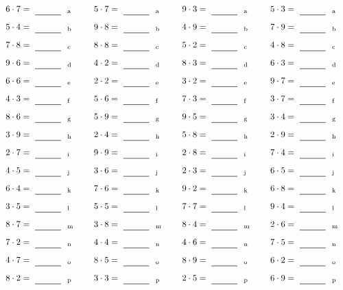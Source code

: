\documentclass
[
  draft    = true,
  fontsize = 11pt,
  parskip  = half-
]
{scrartcl}
\begin{document}
\par\vfill\par
\begin{align*}
    \pline{6\cdot7}&=\rline{a}
  & \pline{5\cdot7}&=\rline{a}
  & \pline{9\cdot3}&=\rline{a}
  & \pline{5\cdot3}&=\rline{a} \\[1ex]
    \pline{5\cdot4}&=\rline{b}
  & \pline{9\cdot8}&=\rline{b}
  & \pline{4\cdot9}&=\rline{b}
  & \pline{7\cdot9}&=\rline{b} \\[1ex]
    \pline{7\cdot8}&=\rline{c}
  & \pline{8\cdot8}&=\rline{c}
  & \pline{5\cdot2}&=\rline{c}
  & \pline{4\cdot8}&=\rline{c} \\[1ex]
    \pline{9\cdot6}&=\rline{d}
  & \pline{4\cdot2}&=\rline{d}
  & \pline{8\cdot3}&=\rline{d}
  & \pline{6\cdot3}&=\rline{d} \\[1ex]
    \pline{6\cdot6}&=\rline{e}
  & \pline{2\cdot2}&=\rline{e}
  & \pline{3\cdot2}&=\rline{e}
  & \pline{9\cdot7}&=\rline{e} \\[1ex]
    \pline{4\cdot3}&=\rline{f}
  & \pline{5\cdot6}&=\rline{f}
  & \pline{7\cdot3}&=\rline{f}
  & \pline{3\cdot7}&=\rline{f} \\[1ex]
    \pline{8\cdot6}&=\rline{g}
  & \pline{5\cdot9}&=\rline{g}
  & \pline{9\cdot5}&=\rline{g}
  & \pline{3\cdot4}&=\rline{g} \\[1ex]
    \pline{3\cdot9}&=\rline{h}
  & \pline{2\cdot4}&=\rline{h}
  & \pline{5\cdot8}&=\rline{h}
  & \pline{2\cdot9}&=\rline{h} \\[1ex]
    \pline{2\cdot7}&=\rline{i}
  & \pline{9\cdot9}&=\rline{i}
  & \pline{2\cdot8}&=\rline{i}
  & \pline{7\cdot4}&=\rline{i} \\[1ex]
    \pline{4\cdot5}&=\rline{j}
  & \pline{3\cdot6}&=\rline{j}
  & \pline{2\cdot3}&=\rline{j}
  & \pline{6\cdot5}&=\rline{j} \\[1ex]
    \pline{6\cdot4}&=\rline{k}
  & \pline{7\cdot6}&=\rline{k}
  & \pline{9\cdot2}&=\rline{k}
  & \pline{6\cdot8}&=\rline{k} \\[1ex]
    \pline{3\cdot5}&=\rline{l}
  & \pline{5\cdot5}&=\rline{l}
  & \pline{7\cdot7}&=\rline{l}
  & \pline{9\cdot4}&=\rline{l} \\[1ex]
    \pline{8\cdot7}&=\rline{m}
  & \pline{3\cdot8}&=\rline{m}
  & \pline{8\cdot4}&=\rline{m}
  & \pline{2\cdot6}&=\rline{m} \\[1ex]
    \pline{7\cdot2}&=\rline{n}
  & \pline{4\cdot4}&=\rline{n}
  & \pline{4\cdot6}&=\rline{n}
  & \pline{7\cdot5}&=\rline{n} \\[1ex]
    \pline{4\cdot7}&=\rline{o}
  & \pline{8\cdot5}&=\rline{o}
  & \pline{8\cdot9}&=\rline{o}
  & \pline{6\cdot2}&=\rline{o} \\[1ex]
    \pline{8\cdot2}&=\rline{p}
  & \pline{3\cdot3}&=\rline{p}
  & \pline{2\cdot5}&=\rline{p}
  & \pline{6\cdot9}&=\rline{p}
\end{align*}
\end{document}
